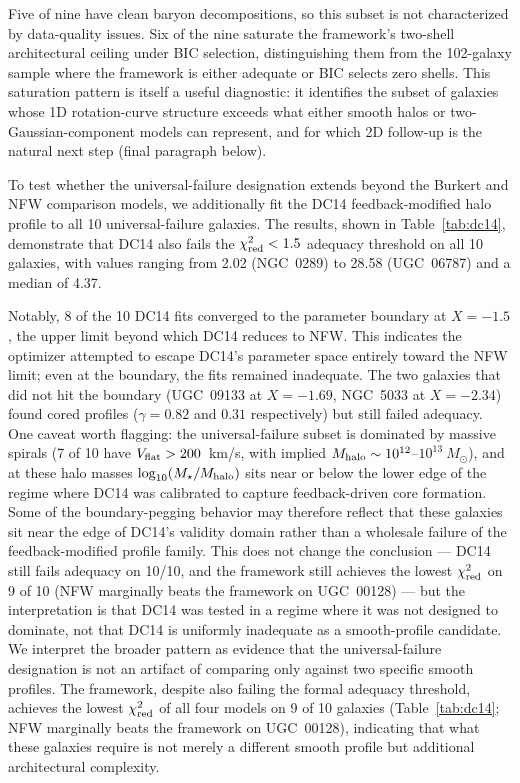 \documentclass[linenumbers]{aastex701}
\newcommand{\Vflat}{V_{\rm flat}}
\newcommand{\Mstar}{M_\star}
\newcommand{\Mhalo}{M_{\rm halo}}
\newcommand{\Msun}{M_\odot}
\newcommand{\chired}{\chi^2_{\rm red}}
\begin{document}
Five of nine have clean baryon decompositions, so this subset is not characterized by data-quality issues. Six of the nine saturate the framework's two-shell architectural ceiling under BIC selection, distinguishing them from the 102-galaxy sample where the framework is either adequate or BIC selects zero shells. This saturation pattern is itself a useful diagnostic: it identifies the subset of galaxies whose 1D rotation-curve structure exceeds what either smooth halos or two-Gaussian-component models can represent, and for which 2D follow-up is the natural next step (final paragraph below).

To test whether the universal-failure designation extends beyond the Burkert and NFW comparison models, we additionally fit the DC14 \citep{DiCintio2014a,DiCintio2014b} feedback-modified halo profile to all 10 universal-failure galaxies. The results, shown in Table~\ref{tab:dc14}, demonstrate that DC14 also fails the $\chired < 1.5$ adequacy threshold on all 10 galaxies, with values ranging from 2.02 (NGC~0289) to 28.58 (UGC~06787) and a median of 4.37.

Notably, 8 of the 10 DC14 fits converged to the parameter boundary at $X = -1.5$, the upper limit beyond which DC14 reduces to NFW. This indicates the optimizer attempted to escape DC14's parameter space entirely toward the NFW limit; even at the boundary, the fits remained inadequate. The two galaxies that did not hit the boundary (UGC~09133 at $X = -1.69$, NGC~5033 at $X = -2.34$) found cored profiles ($\gamma = 0.82$ and $0.31$ respectively) but still failed adequacy. One caveat worth flagging: the universal-failure subset is dominated by massive spirals (7 of 10 have $\Vflat > 200$~km/s, with implied $\Mhalo \sim 10^{12}$--$10^{13}~\Msun$), and at these halo masses $\log_{10}(\Mstar/\Mhalo)$ sits near or below the lower edge of the regime where DC14 was calibrated to capture feedback-driven core formation. Some of the boundary-pegging behavior may therefore reflect that these galaxies sit near the edge of DC14's validity domain rather than a wholesale failure of the feedback-modified profile family. This does not change the conclusion --- DC14 still fails adequacy on 10/10, and the framework still achieves the lowest $\chired$ on 9 of 10 (NFW marginally beats the framework on UGC~00128) --- but the interpretation is that DC14 was tested in a regime where it was not designed to dominate, not that DC14 is uniformly inadequate as a smooth-profile candidate. We interpret the broader pattern as evidence that the universal-failure designation is not an artifact of comparing only against two specific smooth profiles. The framework, despite also failing the formal adequacy threshold, achieves the lowest $\chired$ of all four models on 9 of 10 galaxies (Table~\ref{tab:dc14}; NFW marginally beats the framework on UGC~00128), indicating that what these galaxies require is not merely a different smooth profile but additional architectural complexity.
\end{document}
